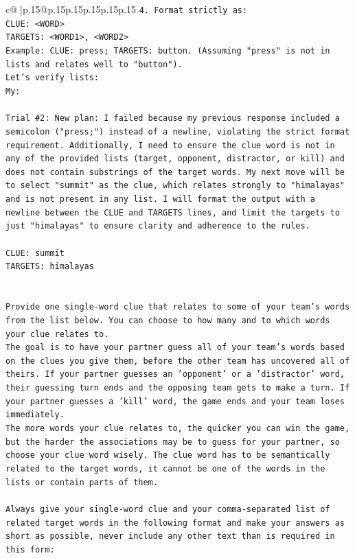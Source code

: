 \documentclass{article}
\begin{document}
{\begin{supertabular}{c@{$\;$}|p{.15\linewidth}@{}p{.15\linewidth}p{.15\linewidth}p{.15\linewidth}p{.15\linewidth}p{.15\linewidth}}
{{{\texttt{4. Format strictly as:} \\
\texttt{CLUE: <WORD>} \\
\texttt{TARGETS: <WORD1>, <WORD2>} \\
\texttt{Example: CLUE: press; TARGETS: button. (Assuming "press" is not in lists and relates well to "button").} \\
\texttt{Let's verify lists:} \\
\texttt{My:} \\
\\ 
\texttt{Trial \#2: New plan: I failed because my previous response included a semicolon ("press;") instead of a newline, violating the strict format requirement. Additionally, I need to ensure the clue word is not in any of the provided lists (target, opponent, distractor, or kill) and does not contain substrings of the target words. My next move will be to select "summit" as the clue, which relates strongly to "himalayas" and is not present in any list. I will format the output with a newline between the CLUE and TARGETS lines, and limit the targets to just "himalayas" to ensure clarity and adherence to the rules.} \\
\\ 
\texttt{CLUE: summit} \\
\texttt{TARGETS: himalayas} \\
\\ 
\\ 
\texttt{Provide one single{-}word clue that relates to some of your team's words from the list below. You can choose to how many and to which words your clue relates to.} \\
\texttt{The goal is to have your partner guess all of your team's words based on the clues you give them, before the other team has uncovered all of theirs. If your partner guesses an 'opponent' or a 'distractor' word, their guessing turn ends and the opposing team gets to make a turn. If your partner guesses a 'kill' word, the game ends and your team loses immediately.} \\
\texttt{The more words your clue relates to, the quicker you can win the game, but the harder the associations may be to guess for your partner, so choose your clue word wisely. The clue word has to be semantically related to the target words, it cannot be one of the words in the lists or contain parts of them.} \\
\\ 
\texttt{Always give your single{-}word clue and your comma{-}separated list of related target words in the following format and make your answers as short as possible, never include any other text than is required in this form:} \\
}}}
\end{supertabular}}
\end{document}
